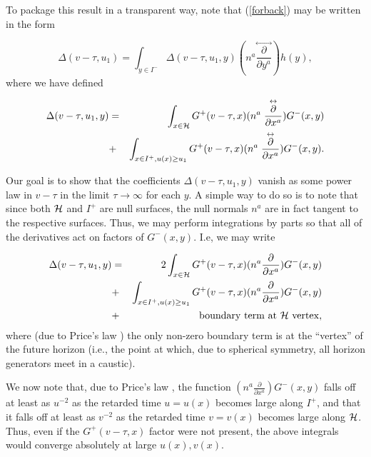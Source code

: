 \documentclass[12pt,onecolumn,eqsecnum,aps,prd,nofootinbib]{revtex4}
\begin{document}
To package this result in a transparent way, note that (\ref{forback}) may be written in the form


\begin{equation}
\Delta(v - \tau, u_1) =\int_{y \in I^-}  \Delta(v - \tau, u_1, y) (n^a  \stackrel
{\leftrightarrow} {\frac{ \partial}{\partial y^a} })  h(y)  ,
\end{equation}
where we have defined 

\begin{eqnarray}
\label{Dcoeffs}
\Delta(v - \tau, u_1, y )&=& \int_{x \in {\cal H}}  G^+(v-\tau, x)   (n^a  \stackrel
{\leftrightarrow} {\frac{ \partial}{\partial x^a} }) G^-(x, y) \nonumber\\ 
&+&  \int_{x \in {I^+}, u(x) \ge u_1} G^+(v-\tau, x)   (n^a  \stackrel
{\leftrightarrow} {\frac{ \partial}{\partial x^a} }) G^-(x, y)  .
\end{eqnarray}

Our goal is to show that the coefficients $\Delta(v - \tau, u_1, y )$ vanish as some power law in $v-\tau$ in the limit $\tau \rightarrow \infty$ for each $y$.  A simple way to do so is to note that since both ${\cal H}$ and $I^+$ are null surfaces, the null normals $n^a$ are in fact tangent to the respective surfaces.  Thus, we may perform integrations by parts so that all of the derivatives act on factors of $G^-(x, y)$.  I.e, we may write

\begin{eqnarray}
\label{Dcoeffs2}
\Delta(v - \tau, u_1, y )&=& 2 \int_{x \in {\cal H}}  G^+(v-\tau, x)   (n^a  
 {\frac{ \partial}{\partial x^a} }) G^-(x, y) \nonumber\\ 
 &+&  \int_{x \in {I^+}, u(x) \ge u_1} G^+(v-\tau, x)   (n^a  
 {\frac{ \partial}{\partial x^a} }) G^-(x, y) \cr  &+& {\rm boundary \ term \ at \ {\cal H} \ vertex },
\end{eqnarray}
where (due to Price's law \cite{GPP,DR}) the only non-zero boundary term is at the ``vertex'' of the future horizon (i.e., the point at which, due to spherical symmetry, all horizon generators meet in a caustic).

We now note that, due to Price's law \cite{GPP,DR}, the function $(n^a  
 {\frac{ \partial}{\partial x^a} }) G^-(x, y)$ falls off at least as $u^{-2}$ as the retarded time $u = u(x)$ becomes large along $I^+$,  and that it falls off at least as $v^{-2}$ as the retarded time $v = v(x)$ becomes large along ${\cal H}$.  Thus, even if the  $G^+(v-\tau, x)$ factor were not present, the above integrals would converge absolutely at large $u(x), v(x)$.  
\end{document}
